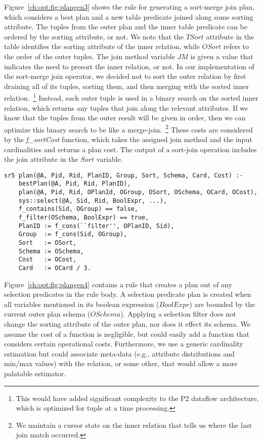 Figure~\ref{ch:opt:fig:plangen3} shows the rule for generating a sort-merge
join plan, which considers a best plan and a new table predicate joined along
some sorting attribute.  The tuples from the outer plan and the inner table
predicate can be ordered by the sorting attribute, or not.  We note that the
$TSort$ attribute in the  table identifies the sorting attribute
of the inner relation, while $OSort$ refers to the order of the outer tuples.
The join method variable $JM$ is given a value that indicates the need to
presort the inner relation, or not.  In our implementation of the sort-merge
join operator, we decided not to sort the outer relation by first draining all
of its tuples, sorting them, and then merging with the sorted inner
relation.~\footnote{This would have added significant complexity to the P2
dataflow architecture, which is optimized for tuple at a time processing.}
Instead, each outer tuple is used in a binary search on the sorted inner
relation, which returns any tuples that join along the relevant attributes.  If
we know that the tuples from the outer result will be given in order, then we
can optimize this binary search to be like a merge-join.~\footnote{We maintain
a cursor state on the inner relation that tells us where the last join match
occurred.} These costs are considered by the {\em f\_sortCost} function, which
takes the assigned join method and the input cardinalities and returns a plan
cost.  The output of a sort-join operation includes the join attribute in the
$Sort$ variable.

\begin{figure*}
\ssp
\centering
\begin{lstlisting}
sr5 plan(@A, Pid, Rid, PlanID, Group, Sort, Schema, Card, Cost) :-
    bestPlan(@A, Pid, Rid, PlanID),
    plan(@A, Pid, Rid, OPlanId, OGroup, OSort, OSchema, OCard, OCost),
    sys::select(@A, Sid, Rid, BoolExpr, ...),
    f_contains(Sid, OGroup) == false,
    f_filter(OSchema, BoolExpr) == true,
    PlanID := f_cons(``filter'', OPlanID, Sid),
    Group  := f_cons(Sid, OGroup),
    Sort   := OSort,
    Schema := OSchema,
    Cost   := OCost,
    Card   := OCard / 3.
\end{lstlisting}
\caption{\label{ch:opt:fig:plangen4}selection predicate filter plan.}
\end{figure*}

Figure~\ref{ch:opt:fig:plangen4} contains a rule that creates a plan out of any
selection predicates in the rule body.  A selection predicate plan is created
when all variables mentioned in its boolean expression ($BoolExpr$) are bounded
by the current outer plan schema ($OSchema$).  Applying a selection filter does
not change the sorting attribute of the outer plan, nor does it effect its
schema.  We assume the cost of a function is negligible, but could easily add a
function that considers certain operational costs.  Furthermore, we use a
generic cardinality estimation but could associate meta-data (e.g., attribute
distributions and min/max values) with the  relation, or some other,
that would allow a more palatable estimator.

